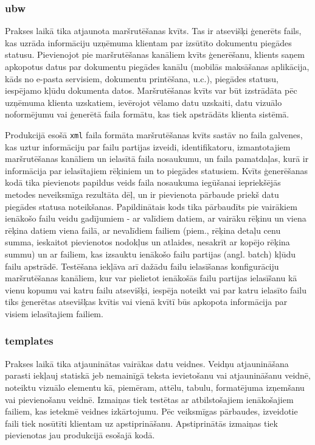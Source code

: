 \subsubsection{ubw}
\par Prakses laikā tika atjaunota maršrutēšanas kvīts. Tas ir atsevišķi ģenerēts fails, kas uzrāda informāciju uzņēmuma klientam par izsūtīto dokumentu piegādes statusu. Pievienojot pie maršrutēšanas kanāliem kvīts ģenerēšanu, klients saņem apkopotus datus par dokumentu piegādes kanālu (mobilās maksāšanas aplikācija, kāds no e-pasta servisiem, dokumentu printēšana, u.c.), piegādes statusu, iespējamo kļūdu dokumenta datos. Maršrutēšanas kvīts var būt izstrādāta pēc uzņēmuma klienta uzskatiem, ievērojot vēlamo datu uzskaiti, datu vizuālo noformējumu vai ģenerētā faila formātu, kas tiek apstrādāts klienta sistēmā.
\par Produkcijā esošā \texttt{xml} faila formāta maršrutēšanas kvīts sastāv no faila galvenes, kas uztur informāciju par failu partijas izveidi, identifikatoru, izmantotajiem maršrutēšanas kanāliem un ielasītā faila nosaukumu, un faila pamatdaļas, kurā ir informācija par ielasītajiem rēķiniem un to piegādes statusiem. Kvīts ģenerēšanas kodā tika pievienots papildus veids faila nosaukuma iegūšanai iepriekšējās metodes neveiksmīga rezultāta dēļ, un ir pievienota pārbaude priekš datu piegādes statusa noteikšanas. Papildinātais kods tika pārbaudīts pie vairākiem ienākošo failu veidu gadījumiem - ar valīdiem datiem, ar vairāku rēķinu un viena rēķina datiem viena failā, ar nevalīdiem failiem (piem., rēķina detaļu cenu summa, ieskaitot pievienotos nodokļus un atlaides, nesakrīt ar kopējo rēķina summu) un ar failiem, kas izsauktu ienākošo failu partijas (angl. batch) kļūdu failu apstrādē. Testēšana iekļāva arī dažādu failu ielasīšanas konfigurāciju maršrutēšanas kanāliem, kur var pielietot ienākošās failu partijas ielasīšanu kā vienu kopumu vai katru failu atsevišķi, iespēja noteikt vai par katru ielasīto failu tiks ģenerētas atsevišķas kvītis vai vienā kvītī būs apkopota informācija par visiem ielasītajiem failiem.


\subsubsection{templates}
\par Prakses laikā tika atjauninātas vairākas datu veidnes. Veidņu atjaunināšana parasti iekļauj statiskā jeb nemainīgā teksta ievietošanu vai atjaunināšanu veidnē, noteiktu vizuālo elementu kā, piemēram, attēlu, tabulu, formatējuma izņemšanu vai pievienošanu veidnē. Izmaiņas tiek testētas ar atbilstošajiem ienākošajiem failiem, kas ietekmē veidnes izkārtojumu. Pēc veiksmīgas pārbaudes, izveidotie faili tiek nosūtīti klientam uz apstiprināšanu. Apstiprinātās izmaiņas tiek pievienotas jau produkcijā esošajā kodā.

